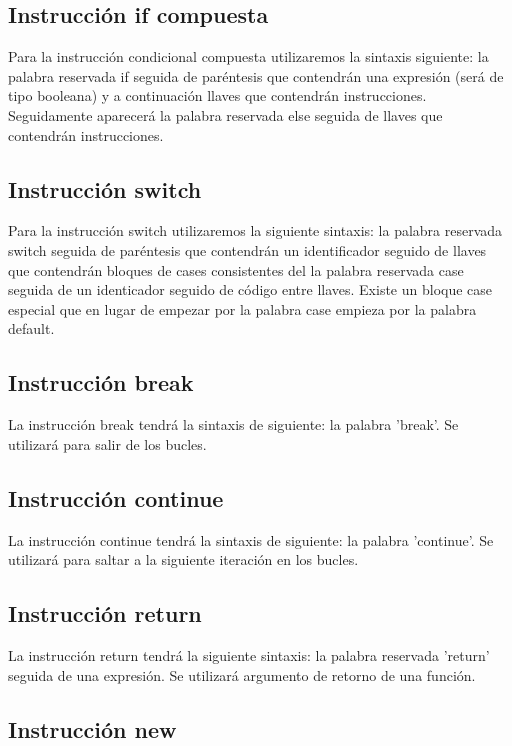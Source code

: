 \documentclass{article}
\begin{document}
\subsection{Instrucción if compuesta}

Para la instrucción condicional compuesta utilizaremos la sintaxis siguiente: la palabra reservada if seguida de paréntesis que contendrán una expresión (será de tipo booleana) y a continuación llaves que contendrán instrucciones. Seguidamente aparecerá la palabra reservada else seguida de llaves que contendrán instrucciones.

\subsection{Instrucción switch}

Para la instrucción switch utilizaremos la siguiente sintaxis: la palabra reservada switch seguida de paréntesis que contendrán un identificador seguido de llaves que contendrán bloques de cases consistentes del la palabra reservada case seguida de un identicador seguido de código entre llaves. Existe un bloque case especial que en lugar de empezar por la palabra case empieza por la palabra default.

\subsection{Instrucción break}

La instrucción break tendrá la sintaxis de siguiente: la palabra 'break'. Se utilizará para salir de los bucles.

\subsection{Instrucción continue}

La instrucción continue tendrá la sintaxis de siguiente: la palabra 'continue'. Se utilizará para saltar a la siguiente iteración en los bucles.

\subsection{Instrucción return}

La instrucción return tendrá la siguiente sintaxis: la palabra reservada 'return' seguida de una expresión. Se utilizará argumento de retorno de una función.

\subsection{Instrucción new}
\end{document}

